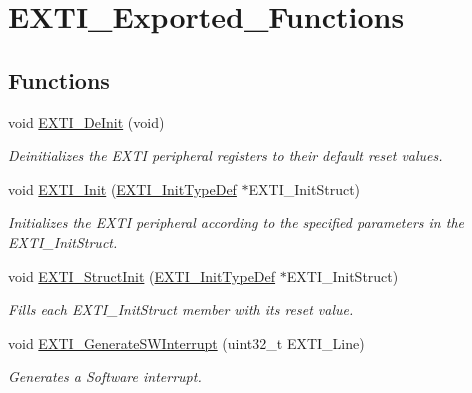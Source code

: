 \hypertarget{group___e_x_t_i___exported___functions}{}\section{E\+X\+T\+I\+\_\+\+Exported\+\_\+\+Functions}
\label{group___e_x_t_i___exported___functions}
\subsection*{Functions}
\begin{DoxyCompactItemize}
\item 
void \mbox{\hyperlink{group___e_x_t_i___exported___functions_ga07072e339cb9ecb9cd9d4b94afc9f317}{E\+X\+T\+I\+\_\+\+De\+Init}} (void)
\begin{DoxyCompactList}\small\item\em Deinitializes the E\+X\+TI peripheral registers to their default reset values. \end{DoxyCompactList}\item 
void \mbox{\hyperlink{group___e_x_t_i___exported___functions_ga8c9ce6352a3a2dfc8fc9287cb24c6501}{E\+X\+T\+I\+\_\+\+Init}} (\mbox{\hyperlink{struct_e_x_t_i___init_type_def}{E\+X\+T\+I\+\_\+\+Init\+Type\+Def}} $\ast$E\+X\+T\+I\+\_\+\+Init\+Struct)
\begin{DoxyCompactList}\small\item\em Initializes the E\+X\+TI peripheral according to the specified parameters in the E\+X\+T\+I\+\_\+\+Init\+Struct. \end{DoxyCompactList}\item 
void \mbox{\hyperlink{group___e_x_t_i___exported___functions_ga86b9e662d18a2f829999cfb26aa7ca20}{E\+X\+T\+I\+\_\+\+Struct\+Init}} (\mbox{\hyperlink{struct_e_x_t_i___init_type_def}{E\+X\+T\+I\+\_\+\+Init\+Type\+Def}} $\ast$E\+X\+T\+I\+\_\+\+Init\+Struct)
\begin{DoxyCompactList}\small\item\em Fills each E\+X\+T\+I\+\_\+\+Init\+Struct member with its reset value. \end{DoxyCompactList}\item 
void \mbox{\hyperlink{group___e_x_t_i___exported___functions_ga897e8ea59f40a19e047fb9994876fc9b}{E\+X\+T\+I\+\_\+\+Generate\+S\+W\+Interrupt}} (uint32\+\_\+t E\+X\+T\+I\+\_\+\+Line)
\begin{DoxyCompactList}\small\item\em Generates a Software interrupt. \end{DoxyCompactList}\item 

\end{DoxyCompactItemize}
